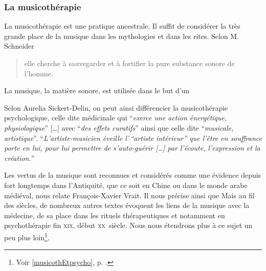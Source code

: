  



\subsubsection{La musicothérapie}
La musicothérapie est une pratique ancestrale. Il suffit de considérer la très grande  place de la musique dans les mythologies et dans les rites.  Selon M. Schneider \blockquote{elle cherche à sauvegarder et à fortifier la pure substance sonore de l'homme\autocite[Voir tome I, pp. 202--203]%
	[M. Schneider, <<Le rôle  de la musique dans la mythologie et les rites des civilisations non européennes>>]{schaeffner.ea:histoire}.}

La musique, la matière sonore, est utilisée dans le but d'un 

 Selon Aurelia Sickert-Delin, on peut ainsi différencier la musicothérapie psychologique, celle dite médicinale qui \enquote{\emph{exerce une action énergétique, physiologique}} [\dots] avec \enquote{\emph{des effets curatifs}}  ainsi que celle dite \enquote{\emph{musicale, artistique}}.
 \enquote{\emph{L'artiste-musicien éveille l'\,``artiste intérieur'' que l'être en souffrance porte en lui, pour lui permettre de s'auto-guérir [\dots] par l'écoute, l'expression et la création.}}\autocite[ch. 1,  p. 14, du texte inédit communiqué par A. Sickert-Delin, musicothérapeute à Alersheim, à J. Viret]{viret:b}
 	 
 	 
Les vertus de la musique sont reconnues et considérés comme une évidence depuis fort longtemps dans l'Antiquité, que ce soit en Chine ou dans le monde arabe médiéval, nous relate François-Xavier Vrait.  
 Il nous précise ainsi que \autocite[ch. III, p. 96]{vrait_musicotherapie_2018} Mais au fil des siècles, de nombreux autres textes évoquent les liens de la musique avec la médecine, de sa place dans les rituels thérapeutiques et notamment en psychothérapie fin \textsc{xix}\ieme, début \textsc{xx}\ieme\ siècle. Nous nous étendrons plus à ce sujet un peu plus loin\footnote{Voir \ref{musicothEtpsycho}, p. \pageref{musicothEtpsycho}.}.
 
